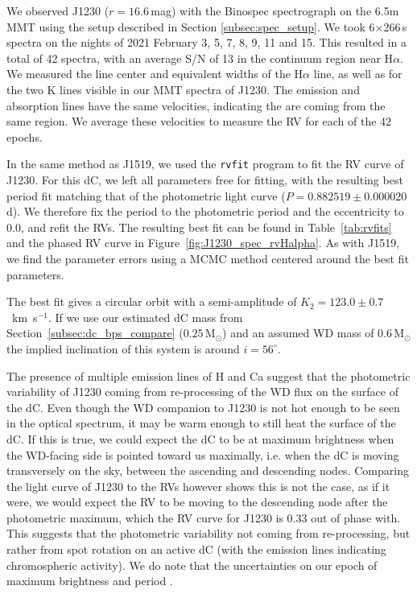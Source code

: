\documentclass[twocolumn]{aastex631}
\begin{document}
We observed J1230 ($r=16.6$\,mag) with the Binospec spectrograph on the 6.5m MMT using the setup described in Section \ref{subsec:spec_setup}. We took 6$\times$266\,s spectra on the nights of 2021 February 3, 5, 7, 8, 9, 11 and 15. This resulted in a total of 42 spectra, with an average S/N of 13 in the continuum region near H$\alpha$. We measured the line center and equivalent widths of the H$\alpha$ line, as well as for the two K lines visible in our MMT spectra of J1230. The emission and absorption lines have the same velocities, indicating the are coming from the same region. We average these velocities to measure the RV for each of the 42 epochs. 


In the same method as J1519, we used the \texttt{rvfit} program to fit the RV curve of J1230. For this dC, we left all parameters free for fitting, with the resulting best period fit matching that of the photometric light curve ($P=0.882519\pm0.000020$\,d). We therefore fix the period to the photometric period and the eccentricity to 0.0, and refit the RVs. The resulting best fit can be found in Table~\ref{tab:rvfits} and the phased RV curve in Figure~\ref{fig:J1230_spec_rvHalpha}. As with J1519, we find the parameter errors using a MCMC method centered around the best fit parameters. 

The best fit gives a circular orbit with a semi-amplitude of $K_2 = 123.0\pm0.7$~km~s$^{-1}$. If we use our estimated dC mass from Section~\ref{subsec:dc_bps_compare} ($0.25$\,M$_{\odot}$) and an assumed WD mass of $0.6$\,M$_{\odot}$ the implied inclination of this system is around $i=56^\circ$.


The presence of multiple emission lines of H and Ca  suggest that the photometric variability of J1230  coming from re-processing of the WD flux on the surface of the dC. Even though the WD companion to J1230 is not hot enough to be seen in the optical spectrum, it may be warm enough to still heat the surface of the dC. If this is true, we could expect the dC to be at maximum brightness when the WD-facing side is pointed toward us maximally, i.e. when the dC is moving transversely on the sky, between the ascending and descending nodes. Comparing the light curve of J1230 to the RVs however shows this is not the case, as if it were, we would expect the RV to be moving to the descending node after the photometric maximum, which the RV curve for J1230 is 0.33 out of phase with. This suggests that the  photometric variability  not  coming from re-processing, but rather from spot rotation on an active dC (with the emission lines indicating chromospheric activity). We do note that the uncertainties on our epoch of maximum brightness and period . 
\end{document}
